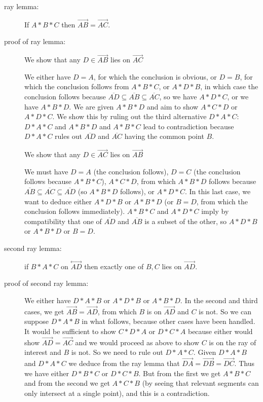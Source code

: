 \documentclass[12pt]{article}
\newcommand\Line[1]{\overset{\leftrightarrow}{#1}}
\begin{document}
\begin{description}

\item[ray lemma:]  If $A*B*C$ then $\overrightarrow{AB} = \overrightarrow{AC}$.

\item[proof of ray lemma:]  We show that any $D \in \overrightarrow{AB}$ lies on $\overrightarrow{AC}$

We either have $D=A$, for which the conclusion is obvious, or $D=B$, for which the conclusion follows from $A*B*C$, or $A*D*B$, in which case the conclusion follows
because $\overline{AD} \subseteq \overline{AB} \subseteq \overline{AC}$, so we have $A*D*C$, or we have $A*B*D$.  We are given $A*B*D$ and aim to show $A*C*D$ or $A*D*C$.  We show this by ruling out
the third alternative $D*A*C$:  $D*A*C$ and $A*B*D$ and $A*B*C$ lead to contradiction because $D*A*C$ rules out $\overline{AD}$ and $\overline{AC}$ having the common point $B$.

We show that any $D \in \overrightarrow{AC}$ lies on $\overrightarrow{AB}$

We must have $D=A$ (the conclusion follows), $D=C$ (the conclusion follows because $A*B*C$), $A*C*D$, from which $A*B*D$ follows because $\overline{AB} \subseteq \overline{AC} \subseteq \overline{AD}$ (so $A*B*D$ follows), or $A*D*C$.  In this last case, we want to deduce either $A*D*B$ or $A*B*D$ (or $B=D$, from which the conclusion follows immediately).  $A*B*C$ and $A*D*C$ imply by compatibility that one of $\overline{AD}$ and $\overline{AB}$ is a subset of the other, so $A*D*B$ or $A*B*D$ or $B=D$.


\item[second ray lemma:] if $B*A*C$ on $\Line{AD}$ then exactly one of $B,C$ lies on $\overrightarrow{AD}$.    


\item[proof of second ray lemma:]  We either have $D*A*B$ or $A*D*B$ or $A*B*D$.  In the second and third cases, we get $\overrightarrow{AB} = \overrightarrow{AD}$, from which $B$ is on $\overrightarrow{AD}$ and $C$ is not.   So we can suppose $D*A*B$ in what follows, because other cases have been handled.  It would be sufficient to show
$C*D*A$ or $D*C*A$ because either would show $\overrightarrow{AD}=\overrightarrow{AC}$ and we would proceed as above to show $C$ is on the ray of interest and $B$ is not.  So we need to rule out $D*A*C$.
Given $D*A*B$ and $D*A*C$ we deduce from the ray lemma that $\overrightarrow{DA} = \overrightarrow{DB} = \overrightarrow {DC}$.  Thus we have either $D*B*C$ or $D*C*B$.  But from the first we get $A*B*C$
and from the second we get $A*C*B$ (by seeing that relevant segments can only intersect at a single point), and this is a contradiction.

\end{description}
\end{document}
